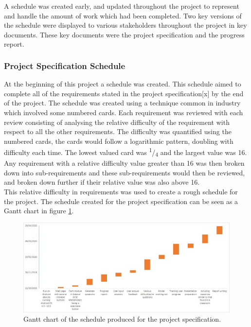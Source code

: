 \documentclass{article}
\begin{document}
A schedule was created early, and updated throughout the project to represent and handle the amount of work which had been completed. Two key versions of the schedule were displayed to various stakeholders throughout the project in key documents. These key documents were the project specification and the progress report. 

\subsubsection{Project Specification Schedule}

At the beginning of this project a schedule was created. This schedule aimed to complete all of the requirements stated in the project specification[x] by the end of the project. The schedule was created using a technique common in industry which involved some numbered cards. Each requirement was reviewed with each review consisting of analysing the relative difficulty of the requirement with respect to all the other requirements. The difficulty was quantified using the numbered cards, the cards would follow a logarithmic pattern, doubling with difficulty each time. The lowest valued card was \textsuperscript{1}/\textsubscript{4} and the largest value was 16. Any requirement with a relative difficulty value greater than 16 was then broken down into sub-requirements and these sub-requirements would then be reviewed, and broken down further if their relative value was also above 16. \\

This relative difficulty in requirements was used to create a rough schedule for the project. The schedule created for the project specification can be seen as a Gantt chart in figure \ref{figure:projectSpecGanttChart}. \\

\begin{figure}[H]
	\centering
	\includegraphics[width=\linewidth]{./data/projectSpecGanttChart.png}
	\caption{Gantt chart of the schedule produced for the project specification.}
	\label{figure:projectSpecGanttChart}
\end{figure}
\end{document}
